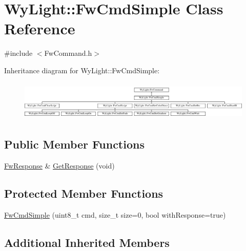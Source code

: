 \hypertarget{class_wy_light_1_1_fw_cmd_simple}{\section{Wy\-Light\-:\-:Fw\-Cmd\-Simple Class Reference}
\label{class_wy_light_1_1_fw_cmd_simple}
}


{\ttfamily \#include $<$Fw\-Command.\-h$>$}

Inheritance diagram for Wy\-Light\-:\-:Fw\-Cmd\-Simple\-:\begin{figure}[H]
\begin{center}
\leavevmode
\includegraphics[height=1.904762cm]{class_wy_light_1_1_fw_cmd_simple}
\end{center}
\end{figure}
\subsection*{Public Member Functions}
\begin{DoxyCompactItemize}
\item 
\hyperlink{class_wy_light_1_1_fw_response}{Fw\-Response} \& \hyperlink{class_wy_light_1_1_fw_cmd_simple_a0d924ef07e2c70417d7300c384c9914d}{Get\-Response} (void)
\end{DoxyCompactItemize}
\subsection*{Protected Member Functions}
\begin{DoxyCompactItemize}
\item 
\hyperlink{class_wy_light_1_1_fw_cmd_simple_a402e4b55a9ba39062ea547c20dfae873}{Fw\-Cmd\-Simple} (uint8\-\_\-t cmd, size\-\_\-t size=0, bool with\-Response=true)
\end{DoxyCompactItemize}
\subsection*{Additional Inherited Members}


